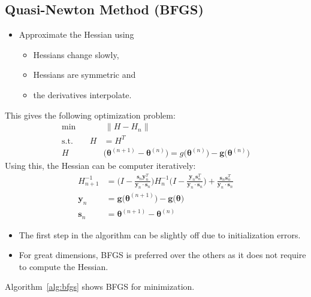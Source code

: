 \documentclass[a4paper, 11pt, accentcolor = tud3b]{tudreport}
\renewcommand{\vec}[1]{\mathbf{#1}}
\begin{document}
			\subsection{Quasi-Newton Method (BFGS)}
				\begin{itemize}
					\item Approximate the Hessian using
						\begin{itemize}
							\item Hessians change slowly,
							\item Hessians are symmetric and
							\item the derivatives interpolate.
						\end{itemize}
				\end{itemize}
				This gives the following optimization problem:
				\begin{align}
					\min \,&\, \lVert H - H_n \rVert \\
					\textrm{s.t.} \qquad
					H & = H^T \\
					H & \big(\vec{\theta}^{(n + 1)} - \vec{\theta}^{(n)}\big) = g\big(\vec{\theta}^{(n)}\big) - \vec{g}\big(\vec{\theta}^{(n)}\big)
				\end{align}
				Using this, the Hessian can be computer iteratively:
				\begin{align}
					H_{n + 1}^{-1} &= \Bigg( I - \frac{\vec{s}_n \vec{y}_n^T}{\vec{y}_n \cdot \vec{s}_n} \Bigg) H_n^{-1}
					                  \Bigg( I - \frac{\vec{y}_n \vec{s}_n^T}{\vec{y}_n \cdot \vec{s}_n} \Bigg)
					                + \frac{\vec{s}_n \vec{s}_n^T}{\vec{y}_n \cdot \vec{s}_n} \\
					\vec{y}_n &= \vec{g}\big(\vec{\theta}^{(n + 1)}\big) - \vec{g}\big(\vec{\theta}\big) \\
					\vec{s}_n &= \vec{\theta}^{(n + 1)} - \vec{\theta}^{(n)}
				\end{align}

				\begin{itemize}
					\item The first step in the algorithm can be slightly off due to initialization errors.
					\item For great dimensions, BFGS is preferred over the others as it does not require to compute the Hessian.
				\end{itemize}

				Algorithm~\ref{alg:bfgs} shows BFGS for minimization.
\end{document}
